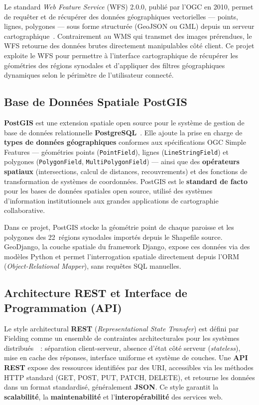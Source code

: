 \documentclass[12pt, a4paper]{report}
\newcommand{\kw}[1]{\textbf{#1}}
\begin{document}
Le standard \textit{Web Feature Service} (WFS) 2.0.0, publié par l'OGC en 2010,
permet de requêter et de récupérer des données géographiques vectorielles ---
points, lignes, polygones --- sous forme structurée (GeoJSON ou GML) depuis un
serveur cartographique~\cite{ogcwfs2010}. Contrairement au WMS qui transmet des
images prérendues, le WFS retourne des données brutes directement manipulables
côté client. Ce projet exploite le WFS pour permettre à l'interface cartographique
de récupérer les géométries des régions synodales et d'appliquer des filtres
géographiques dynamiques selon le périmètre de l'utilisateur connecté.

\subsection{Base de Données Spatiale PostGIS}

\kw{PostGIS} est une extension spatiale open source pour le système de gestion de
base de données relationnelle \kw{PostgreSQL}~\cite{postgis2023}. Elle ajoute la
prise en charge de \textbf{types de données géographiques} conformes aux
spécifications OGC Simple Features --- géométries points (\texttt{PointField}),
lignes (\texttt{LineStringField}) et polygones (\texttt{PolygonField},
\texttt{MultiPolygonField}) --- ainsi que des \textbf{opérateurs spatiaux}
(intersections, calcul de distances, recouvrements) et des fonctions de
transformation de systèmes de coordonnées. PostGIS est le \textbf{standard de
facto} pour les bases de données spatiales open source, utilisé des systèmes
d'information institutionnels aux grandes applications de cartographie
collaborative.

Dans ce projet, PostGIS stocke la géométrie point de chaque paroisse et les
polygones des 22~régions synodales importés depuis le Shapefile source.
GeoDjango, la couche spatiale du framework Django, expose ces données via des
modèles Python et permet l'interrogation spatiale directement depuis l'ORM
(\textit{Object-Relational Mapper}), sans requêtes SQL manuelles.

\subsection{Architecture REST et Interface de Programmation (API)}

Le style architectural \kw{REST} (\textit{Representational State Transfer}) est
défini par Fielding comme un ensemble de contraintes architecturales pour les
systèmes distribués~\cite{fielding2000}~: séparation client-serveur, absence
d'état côté serveur (\textit{stateless}), mise en cache des réponses, interface
uniforme et système de couches. Une \kw{API REST} expose des ressources
identifiées par des URI, accessibles via les méthodes HTTP standard
(GET, POST, PUT, PATCH, DELETE), et retourne les données dans un format
standardisé, généralement \textbf{JSON}. Ce style garantit la \textbf{scalabilité},
la \textbf{maintenabilité} et l'\textbf{interopérabilité} des services web.
\end{document}
